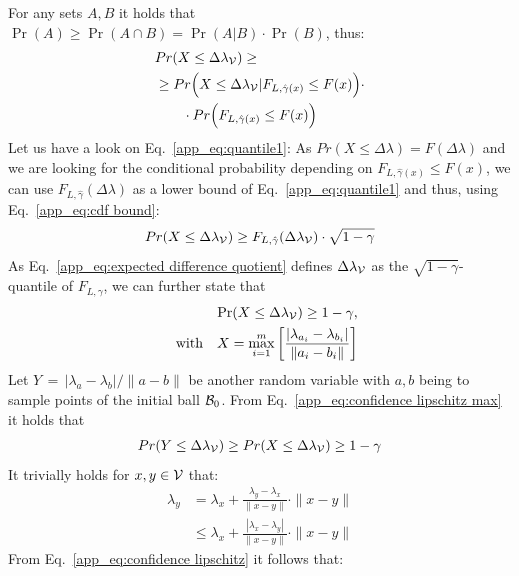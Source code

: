 For any sets $A, B$ it holds that $\Pr(A)\ge \Pr(A\cap B) = \Pr(A | B) \cdot \Pr(B)$, thus:
\begin{align}
    &Pr(X \le \Delta\lambda_{\mathcal{V}}) \ge\\
    &\ge Pr\Big(X\le\Delta\lambda_{\mathcal{V}} | F_{L,\hat{\gamma}(x)} \le F(x)\Big)\cdot\label{app_eq:quantile1}\\
    &\qquad\cdot Pr\Big(F_{L,\hat{\gamma}(x)} \le F(x)\Big)
\end{align}
Let us have a look on Eq.~\eqref{app_eq:quantile1}: As $Pr(X\le \Delta\lambda)=F(\Delta\lambda)$ and we are looking for the conditional probability depending on $F_{L,\hat{\gamma}(x)} \le F(x)$, we can use $F_{L,\hat{\gamma}}(\Delta\lambda)$ as a lower bound of Eq.~\eqref{app_eq:quantile1} and thus, using Eq.~\eqref{app_eq:cdf bound}:
\begin{align}
    Pr(X\le \Delta\lambda_{\mathcal{V}}) \ge F_{L,\hat{\gamma}}(\Delta\lambda_{\mathcal{V}})\cdot \sqrt{1-\gamma}
\end{align}
As Eq.~\eqref{app_eq:expected difference quotient} defines $\Delta\lambda_{\mathcal{V}}$ as the $\sqrt{1-\gamma}$-quantile of $F_{L,\gamma}$, we can further state that
\begin{align}\label{app_eq:confidence lipschitz max}
    \begin{split}
    \Pr(X \le \Delta\lambda_{\mathcal{V}})\ge 1-\gamma, \\\quad \textrm{with}\quad X=\max_{i=1}^m\left[\frac{|\lambda_{a_i} -  \lambda_{b_i}|}{\|a_i-b_i\|}\right]
    \end{split}
\end{align}
Let $Y\,=\, |\lambda_a-\lambda_b|/\|a-b\|$ be another random variable with $a, b$ being to sample points of the initial ball $\mathcal{B}_0$. From Eq.~\eqref{app_eq:confidence lipschitz max} it holds that
\begin{align}\label{app_eq:confidence lipschitz}
    Pr(Y\le \Delta\lambda_{\mathcal{V}})\ge Pr(X\le \Delta\lambda_{\mathcal{V}})\ge 1-\gamma
\end{align}
It trivially holds for $x, y \in \mathcal{V}$ that:
\begin{align}
    \lambda_y &= \lambda_x + \frac{\lambda_y - \lambda_x}{\|x-y\|}\cdot \|x-y\|\nonumber\\
    &\le \lambda_x + \frac{|\lambda_x - \lambda_y|}{\|x-y\|}\cdot \|x-y\|%
\end{align}
From Eq.~\eqref{app_eq:confidence lipschitz} it follows that:
